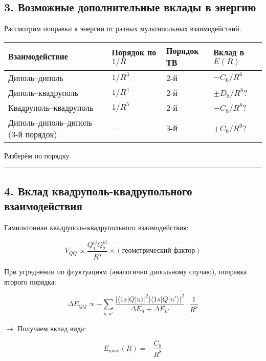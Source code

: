 \documentclass[11pt]{article}
\begin{document}
\subsection{3. Возможные дополнительные вклады в
энергию}\label{ux432ux43eux437ux43cux43eux436ux43dux44bux435-ux434ux43eux43fux43eux43bux43dux438ux442ux435ux43bux44cux43dux44bux435-ux432ux43aux43bux430ux434ux44b-ux432-ux44dux43dux435ux440ux433ux438ux44e}

Рассмотрим поправки к энергии от разных мультипольных взаимодействий.

\begin{longtable}[]{@{}llll@{}}
\toprule
Взаимодействие & Порядок по \(1/R\) & Порядок ТВ & Вклад в
\(E(R)\)\tabularnewline
\midrule
\endhead
Диполь--диполь & \(1/R^3\) & 2-й & \(-C_6 / R^6\)\tabularnewline
Диполь--квадруполь & \(1/R^4\) & 2-й & \(\pm D_8 / R^8\)?\tabularnewline
Квадруполь--квадруполь & \(1/R^5\) & 2-й &
\(-C_8 / R^8\)?\tabularnewline
Диполь--диполь--диполь (3-й порядок) & --- & 3-й &
\(\pm C_9 / R^9\)?\tabularnewline
\bottomrule
\end{longtable}

Разберём по порядку.

\begin{center}\rule{0.5\linewidth}{\linethickness}\end{center}

\subsection{4. Вклад квадруполь-квадрупольного
взаимодействия}\label{ux432ux43aux43bux430ux434-ux43aux432ux430ux434ux440ux443ux43fux43eux43bux44c-ux43aux432ux430ux434ux440ux443ux43fux43eux43bux44cux43dux43eux433ux43e-ux432ux437ux430ux438ux43cux43eux434ux435ux439ux441ux442ux432ux438ux44f}

Гамильтониан квадруполь-квадрупольного взаимодействия:

\[
V_{QQ} \propto \frac{Q_1^{ij} Q_2^{kl}}{R^5} \times (\text{геометрический фактор})
\]

При усреднении по флуктуациям (аналогично дипольному случаю), поправка
второго порядка:

\[
\Delta E_{QQ} \propto - \sum_{n,n'} \frac{ |\langle 1s| Q |n \rangle|^2 |\langle 1s| Q |n' \rangle|^2 }{ \Delta E_n + \Delta E_{n'} } \cdot \frac{1}{R^8}
\]

$\rightarrow$ Получаем вклад вида:

\[
E_{\text{quad}}(R) = -\frac{C_8}{R^8}
\]
\end{document}
